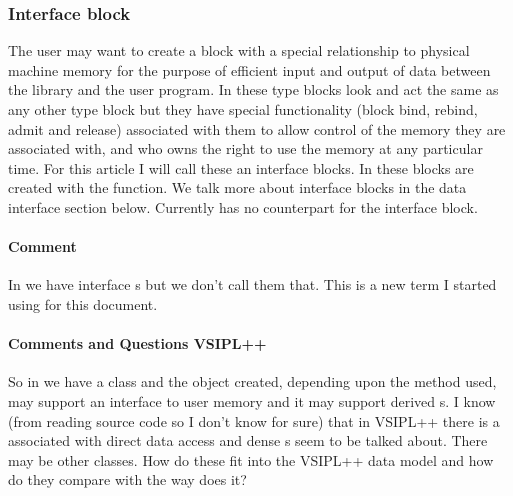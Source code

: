 \subsubsection{Interface block}
The user may want to create a block with a special relationship to physical machine memory for the purpose of efficient input and output of data between the library and the user program. In \cvl{} these type blocks look and act the same as any other type block but they have special functionality (block bind, rebind, admit and release) associated with them to allow control of the memory they are associated with, and who owns the right to use the memory at any particular time. For this article I will call these an interface blocks.  In \cvl{} these blocks are created with the  function. We talk more about interface blocks in the data interface section below.  Currently \pyjv{} has no counterpart for the interface block.
\paragraph{Comment} In \cvl{} we have interface \blk{}s but we don't call them that.  This is a new term I started using for this document.
\paragraph*{Comments and Questions VSIPL++}
So in \cvl{} we have a \Blk{} class and the object created, depending upon the method used, may support an interface to user memory and it may support derived \blk{}s.  I know (from reading source code so I don't know for sure) that in VSIPL++ there is a \blk{} associated with direct data access and dense \blk{}s seem to be talked about. There may be other \Blk{} classes. How do these fit into the VSIPL++ data model and how do they compare with the way \cvl{} does it?
%